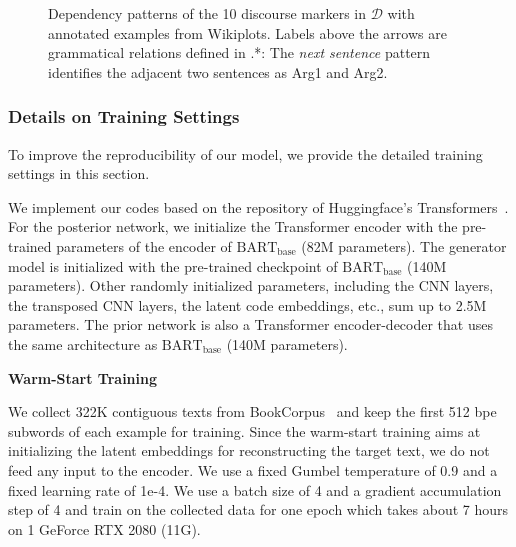 \documentclass[11pt]{article}
\begin{document}
\begin{figure}[h!]

    \caption{Dependency patterns of the 10 discourse markers in $\mathcal{D}$ with annotated examples from Wikiplots. Labels above the arrows are grammatical relations defined in \citet{manning-EtAl:2014:P14-5}.*: The \textit{next sentence} pattern identifies the adjacent two sentences as Arg1 and Arg2. }
    \label{fig:patterns}
\end{figure}

\subsubsection{Details on Training Settings}\label{sec:train_detail}

To improve the reproducibility of our model, we provide the detailed training settings in this section. 

We implement our codes based on the repository of Huggingface's Transformers~\citep{wolf-etal-2020-transformers}. For the posterior network, we initialize the Transformer encoder with the pre-trained parameters of the encoder of $\text{BART}_{\text{base}}$ (82M parameters). The generator model is initialized with the pre-trained checkpoint of $\text{BART}_{\text{base}}$ (140M parameters). Other randomly initialized parameters, including the CNN layers, the transposed CNN layers, the latent code embeddings, etc., sum up to 2.5M parameters. The prior network is also a Transformer encoder-decoder that uses the same architecture as $\text{BART}_{\text{base}}$ (140M parameters).

\noindent\textbf{Warm-Start Training}

We collect 322K contiguous texts from BookCorpus~\citep{bookcorpus} and keep the first 512 bpe subwords of each example for training. Since the warm-start training aims at initializing the latent embeddings for reconstructing the target text, we do not feed any input to the encoder. We use a fixed Gumbel temperature of 0.9 and a fixed learning rate of 1e-4. We use a batch size of 4 and a gradient accumulation step of 4 and train on the collected data for one epoch which takes about 7 hours on 1 GeForce RTX 2080 (11G).
\end{document}
